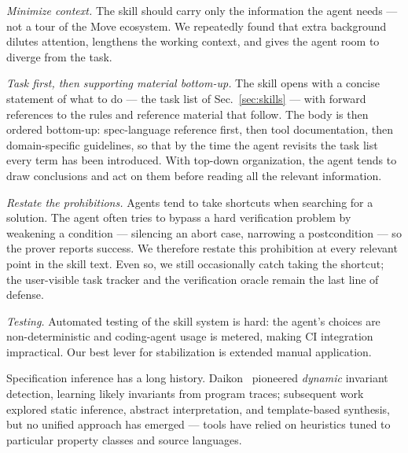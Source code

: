\begin{Itemize}
\item \emph{Minimize context.}
The skill should carry only the information the agent needs --- not a tour of the Move ecosystem.
We repeatedly found that extra background dilutes attention, lengthens the working context, and gives the agent room to diverge from the task.

\item \emph{Task first, then supporting material bottom-up.}
The skill opens with a concise statement of what to do --- the task list of Sec.~\ref{sec:skills} --- with forward references to the rules and reference material that follow.
The body is then ordered bottom-up: spec-language reference first, then tool documentation, then domain-specific guidelines, so that by the time the agent revisits the task list every term has been introduced. With top-down organization, the agent tends to draw conclusions and act on them before reading all the relevant information.

\item \emph{Restate the prohibitions.}
Agents tend to take shortcuts when searching for a solution.
The agent often tries to bypass a hard verification problem by weakening a condition --- silencing an abort case, narrowing a postcondition --- so the prover reports success.
We therefore restate this prohibition at every relevant point in the skill text.
Even so, we still occasionally catch \CC taking the shortcut; the user-visible task tracker and the verification oracle remain the last line of defense.

\item \emph{Testing.}
Automated testing of the skill system is hard: the agent's choices are non-deterministic and coding-agent usage is metered, making CI integration impractical. Our best lever for stabilization is extended manual application.
\end{Itemize}

%


Specification inference has a long history.
Daikon~\cite{DaikonTSE01} pioneered \emph{dynamic} invariant detection, learning likely invariants from program traces; subsequent work explored static inference, abstract interpretation, and template-based synthesis, but no unified approach has emerged --- tools have relied on heuristics tuned to particular property classes and source languages.

